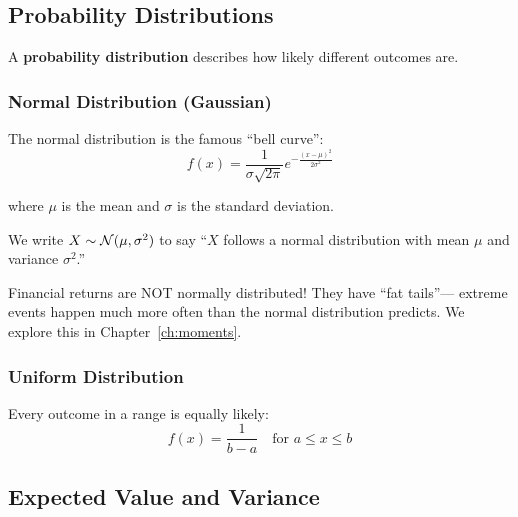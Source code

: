 \subsection{Probability Distributions}

A \textbf{probability distribution} describes how likely different outcomes are.

\subsubsection{Normal Distribution (Gaussian)}


The normal distribution is the famous ``bell curve'':
\[
f(x) = \frac{1}{\sigma\sqrt{2\pi}} e^{-\frac{(x-\mu)^2}{2\sigma^2}}
\]

where $\mu$ is the mean and $\sigma$ is the standard deviation.

We write $X \sim \mathcal{N}(\mu, \sigma^2)$ to say ``$X$ follows a normal
distribution with mean $\mu$ and variance $\sigma^2$.''

\begin{warning}
Financial returns are NOT normally distributed! They have ``fat tails''---
extreme events happen much more often than the normal distribution predicts.
We explore this in Chapter~\ref{ch:moments}.
\end{warning}

\subsubsection{Uniform Distribution}

Every outcome in a range is equally likely:
\[
f(x) = \frac{1}{b - a} \quad \text{for } a \leq x \leq b
\]

\subsection{Expected Value and Variance}


